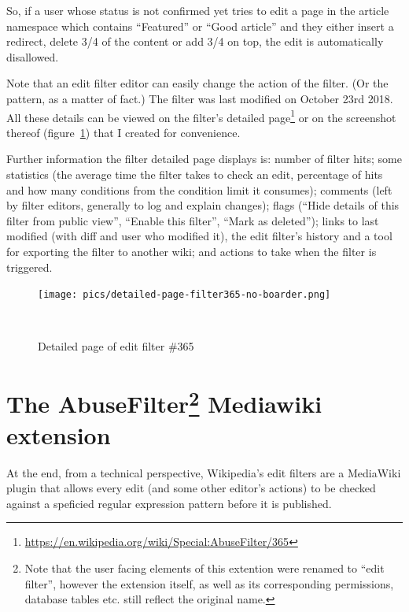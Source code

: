 So, if a user whose status is not confirmed yet tries to edit a page in the article namespace which contains ``Featured'' or ``Good article'' and they either insert a redirect, delete 3/4 of the content or add 3/4 on top, the edit is automatically disallowed.

Note that an edit filter editor can easily change the action of the filter. (Or the pattern, as a matter of fact.)
The filter was last modified on October 23rd 2018.
All these details can be viewed on the filter's detailed page\footnote{\url{https://en.wikipedia.org/wiki/Special:AbuseFilter/365}}
or on the screenshot thereof (figure~\ref{fig:filter-details}) that I created for convenience.

Further information the filter detailed page displays is:
number of filter hits;
some statistics (the average time the filter takes to check an edit, percentage of hits and how many conditions from the condition limit it consumes);%
comments (left by filter editors, generally to log and explain changes);
flags (``Hide details of this filter from public view'', ``Enable this filter'', ``Mark as deleted'');
links to last modified (with diff and user who modified it), the edit filter's history and a tool for exporting the filter to another wiki;
and actions to take when the filter is triggered.

\begin{figure}
\centering
  \texttt{[image: pics/detailed-page-filter365-no-boarder.png]}
  \caption{Detailed page of edit filter \#365}~\label{fig:filter-details}
\end{figure}


\section{The AbuseFilter\footnote{Note that the user facing elements of this extention were renamed to ``edit filter'', however the extension itself, as well as its corresponding permissions, database tables etc. still reflect the original name.} Mediawiki extension}
\label{sec:mediawiki-ext}

At the end, from a technical perspective, Wikipedia's edit filters are a MediaWiki plugin that allows every edit (and some other editor's actions) to be checked against a speficied regular expression pattern before it is published.

